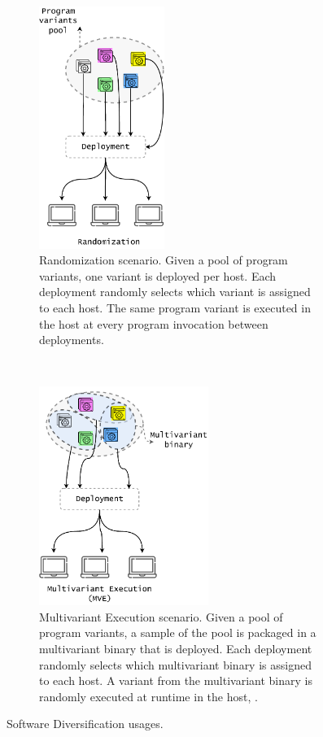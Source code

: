 \newcommand{\rulesep}{\unskip\ \vrule\ }
\begin{figure}[h]
    \centering
    \begin{subfigure}[t]{0.45\textwidth}
        \centering
        \includegraphics[height=3.1in]{diagrams/randomization.pdf}
        \vspace{0.5cm}
        \caption{Randomization scenario. Given a pool of program variants, one variant is deployed per host. Each deployment randomly selects which variant is assigned to each host. The same program variant is executed in the host at every program invocation between deployments. }        \label{diagrams:sota:randomization}

    \end{subfigure}
    \hspace{1.5mm}
    \rulesep
    \hspace{1.5mm}
    \begin{subfigure}[t]{0.45\textwidth}
        \centering
        \includegraphics[height=2.8in]{diagrams/mve.pdf}
        \caption{Multivariant Execution scenario. Given a pool of program variants, a sample of the pool is packaged in a multivariant binary that is deployed. Each deployment randomly selects which multivariant binary is assigned to each host. A variant from the multivariant binary is randomly executed at runtime in the host, .}        \label{diagrams:sota:mve}

    \end{subfigure}
    \caption{Software Diversification usages.}
\end{figure}

